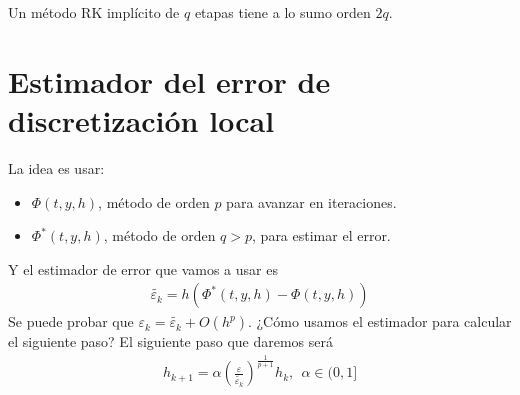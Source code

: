 \begin{teo}
    Un método RK implícito de $q$ etapas tiene a lo sumo orden $2q$.
\end{teo}

\section{Estimador del error de discretización local}
La idea es usar:
\begin{itemize}
    \item $\Phi(t,y,h)$, método de orden $p$ para avanzar en iteraciones.
    \item $\Phi^*(t,y,h)$, método de orden $q > p$, para estimar el error.
\end{itemize}
Y el estimador de error que vamos a usar es
\begin{align*}
    \widetilde{\varepsilon_k} = h(\Phi^*(t,y,h) - \Phi(t,y,h))
\end{align*}
Se puede probar que $\varepsilon_k = \widetilde{\varepsilon_k} + O(h^p)$. ¿Cómo usamos el estimador para calcular el siguiente paso? El siguiente paso que daremos será
\begin{align*}
    h_{k+1} = \alpha \left( \frac{\varepsilon}{\widetilde{\varepsilon_k}} \right)^{\frac{1}{p+1}}h_k, \ \ \alpha \in (0,1]
\end{align*}
